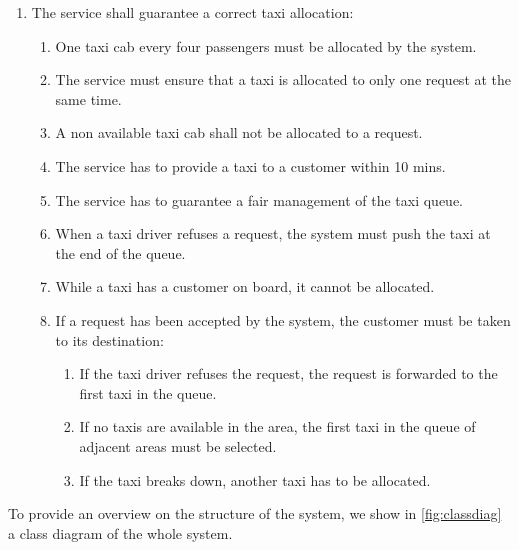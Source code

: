 \begin{enumerate}
	\item The service shall guarantee a correct taxi allocation: \begin{enumerate}
		\item One taxi cab every four passengers must be allocated by the system.
		\item The service must ensure that a taxi is allocated to only one request at the same time.
		\item A non available taxi cab shall not be allocated to a request.
		\item The service has to provide a taxi to a customer within 10 mins.
		\item The service has to guarantee a fair management of the taxi queue.
		\item When a taxi driver refuses a request, the system must push the taxi at the end of the queue.
		\item While a taxi has a customer on board, it cannot be allocated.
		\item If a request has been accepted by the system, the customer must be taken to its destination: \begin{enumerate}
			\item If the taxi driver refuses the request, the request is forwarded to the first taxi in the queue.
			\item If no taxis are available in the area, the first taxi in the queue of adjacent areas must be selected.
			\item If the taxi breaks down, another taxi has to be allocated.
		\end{enumerate}
	\end{enumerate}
 
\end{enumerate}


To provide an overview on the structure of the system, we show in \cref{fig:classdiag} a class diagram of the whole system.


